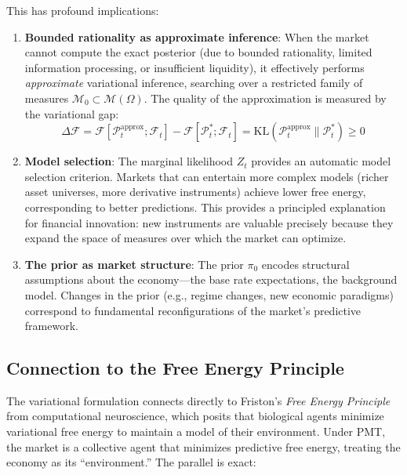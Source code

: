 \documentclass[12pt,a4paper]{article}
\theoremstyle{definition}
\newcommand{\F}{\mathcal{F}}
\newcommand{\M}{\mathcal{M}}
\newcommand{\PP}{\mathcal{P}}
\newcommand{\KL}{\mathrm{KL}}
\begin{document}
This has profound implications:

\begin{enumerate}[label=(\roman*)]
    \item \textbf{Bounded rationality as approximate inference}: When the market cannot compute the exact posterior (due to bounded rationality, limited information processing, or insufficient liquidity), it effectively performs \emph{approximate} variational inference, searching over a restricted family of measures $\M_0 \subset \M(\Omega)$. The quality of the approximation is measured by the variational gap:
    \begin{equation}\label{eq:variational_gap}
        \Delta \mathcal{F} = \mathcal{F}[\PP_t^{\text{approx}}; \F_t] - \mathcal{F}[\PP_t^*; \F_t] = \KL(\PP_t^{\text{approx}} \| \PP_t^*) \geq 0
    \end{equation}
    
    \item \textbf{Model selection}: The marginal likelihood $Z_t$ provides an automatic model selection criterion. Markets that can entertain more complex models (richer asset universes, more derivative instruments) achieve lower free energy, corresponding to better predictions. This provides a principled explanation for financial innovation: new instruments are valuable precisely because they expand the space of measures over which the market can optimize.
    
    \item \textbf{The prior as market structure}: The prior $\pi_0$ encodes structural assumptions about the economy---the base rate expectations, the background model. Changes in the prior (e.g., regime changes, new economic paradigms) correspond to fundamental reconfigurations of the market's predictive framework.
\end{enumerate}

\subsection{Connection to the Free Energy Principle}

The variational formulation connects directly to Friston's \emph{Free Energy Principle} \citep{friston2010} from computational neuroscience, which posits that biological agents minimize variational free energy to maintain a model of their environment. Under PMT, the market is a collective agent that minimizes predictive free energy, treating the economy as its ``environment.'' The parallel is exact:
\end{document}
